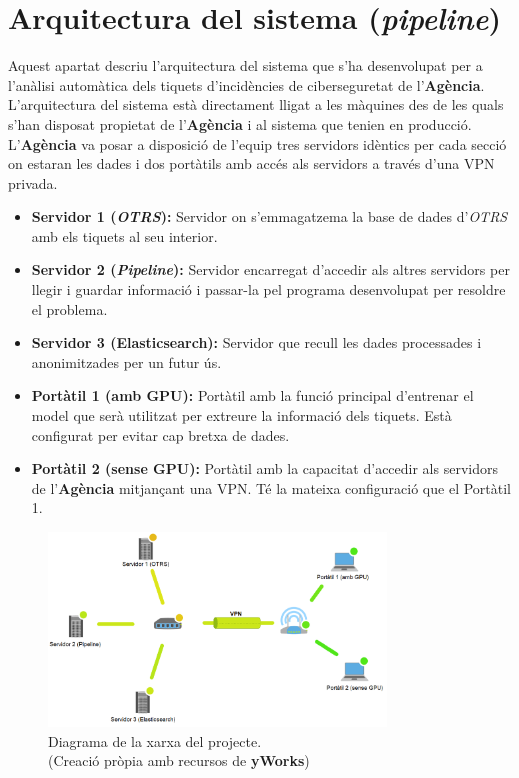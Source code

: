 \section{Arquitectura del sistema (\textit{pipeline})}
Aquest apartat descriu l'arquitectura del sistema que s'ha desenvolupat per a l'anàlisi automàtica dels tiquets d'incidències de ciberseguretat de l'\textbf{Agència}. L'arquitectura del sistema està directament lligat a les màquines des de les quals s'han disposat propietat de l'\textbf{Agència} i al sistema que tenien en producció. L'\textbf{Agència} va posar a disposició de l'equip tres servidors idèntics per cada secció on estaran les dades i dos portàtils amb accés als servidors a través d'una VPN privada.

\begin{itemize}
     \item \textbf{Servidor 1 (\textit{OTRS}):} Servidor on s'emmagatzema la base de dades d'\textit{OTRS} amb els tiquets al seu interior.
     \item \textbf{Servidor 2 (\textit{Pipeline}):} Servidor encarregat d'accedir als altres servidors per llegir i guardar informació i passar-la pel programa desenvolupat per resoldre el problema.
     \item \textbf{Servidor 3 (Elasticsearch):} Servidor que recull les dades processades i anonimitzades per un futur ús.
\end{itemize}

\begin{itemize}
     \item \textbf{Portàtil 1 (amb GPU):} Portàtil amb la funció principal d'entrenar el model que serà utilitzat per extreure la informació dels tiquets. Està configurat per evitar cap bretxa de dades.
     \item \textbf{Portàtil 2 (sense GPU):} Portàtil amb la capacitat d'accedir als servidors de l'\textbf{Agència} mitjançant una VPN. Té la mateixa configuració que el Portàtil 1.
\end{itemize}

\begin{figure}[H]
     \centering
     \includegraphics[width=0.8\textwidth]{network.png}
     \caption[Diagrama de la xarxa del projecte]{Diagrama de la xarxa del projecte. \\ (Creació pròpia amb recursos de \textbf{yWorks})}
     \label{fig:network}
\end{figure}

